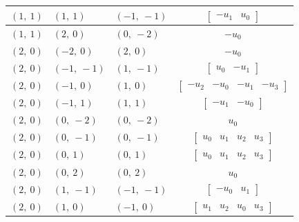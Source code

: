 \documentclass[11pt]{article}
\theoremstyle{definition}
\begin{document}
\begin{longtable}{|l|l|l|c|}
    \hline
    $\left( 1, \  1\right)$ & $\left( 1, \  1\right)$ & $\left( -1, \  -1\right)$ & $\left[\begin{matrix}- u_{1} & u_{0}\end{matrix}\right]$ \\
    \hline
    $\left( 1, \  1\right)$ & $\left( 2, \  0\right)$ & $\left( 0, \  -2\right)$ & $- u_{0}$ \\
    \hline
    $\left( 2, \  0\right)$ & $\left( -2, \  0\right)$ & $\left( 2, \  0\right)$ & $- u_{0}$ \\
    \hline
    $\left( 2, \  0\right)$ & $\left( -1, \  -1\right)$ & $\left( 1, \  -1\right)$ & $\left[\begin{matrix}u_{0} & - u_{1}\end{matrix}\right]$ \\
    \hline
    $\left( 2, \  0\right)$ & $\left( -1, \  0\right)$ & $\left( 1, \  0\right)$ & $\left[\begin{matrix}- u_{2} & - u_{0} & - u_{1} & - u_{3}\end{matrix}\right]$ \\
    \hline
    $\left( 2, \  0\right)$ & $\left( -1, \  1\right)$ & $\left( 1, \  1\right)$ & $\left[\begin{matrix}- u_{1} & - u_{0}\end{matrix}\right]$ \\
    \hline
    $\left( 2, \  0\right)$ & $\left( 0, \  -2\right)$ & $\left( 0, \  -2\right)$ & $u_{0}$ \\
    \hline
    $\left( 2, \  0\right)$ & $\left( 0, \  -1\right)$ & $\left( 0, \  -1\right)$ & $\left[\begin{matrix}u_{0} & u_{1} & u_{2} & u_{3}\end{matrix}\right]$ \\
    \hline
    $\left( 2, \  0\right)$ & $\left( 0, \  1\right)$ & $\left( 0, \  1\right)$ & $\left[\begin{matrix}u_{0} & u_{1} & u_{2} & u_{3}\end{matrix}\right]$ \\
    \hline
    $\left( 2, \  0\right)$ & $\left( 0, \  2\right)$ & $\left( 0, \  2\right)$ & $u_{0}$ \\
    \hline
    $\left( 2, \  0\right)$ & $\left( 1, \  -1\right)$ & $\left( -1, \  -1\right)$ & $\left[\begin{matrix}- u_{0} & u_{1}\end{matrix}\right]$ \\
    \hline
    $\left( 2, \  0\right)$ & $\left( 1, \  0\right)$ & $\left( -1, \  0\right)$ & $\left[\begin{matrix}u_{1} & u_{2} & u_{0} & u_{3}\end{matrix}\right]$ \\

\end{longtable}
\end{document}
